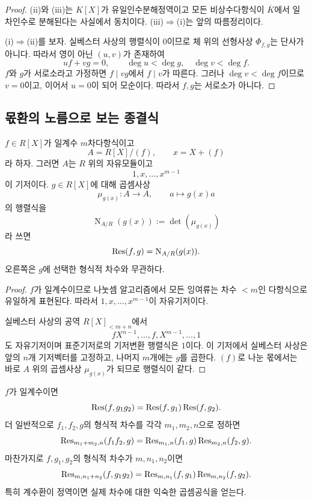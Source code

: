 \begin{proof}
(ii)와 (iii)는 $K[X]$가 유일인수분해정역이고 모든 비상수다항식이 $\overline K$에서 일차인수로 분해된다는 사실에서 동치이다. (iii)$\Rightarrow$(i)는 앞의 따름정리이다.

(i)$\Rightarrow$(ii)를 보자. 실베스터 사상의 행렬식이 $0$이므로 체 위의 선형사상 $\Phi_{f,g}$는 단사가 아니다. 따라서 영이 아닌 $(u,v)$가 존재하여
\[
  uf+vg=0,
  \qquad
  \deg u<\deg g,\quad \deg v<\deg f.
\]
$f$와 $g$가 서로소라고 가정하면 $f\mid vg$에서 $f\mid v$가 따른다. 그러나 $\deg v<\deg f$이므로 $v=0$이고, 이어서 $u=0$이 되어 모순이다. 따라서 $f,g$는 서로소가 아니다.
\end{proof}

\subsection{몫환의 노름으로 보는 종결식}

\begin{proposition}[노름 해석]
\label{prop:resultant-norm}
$f\in R[X]$가 일계수 $m$차다항식이고
\[
  A=R[X]/(f),
  \qquad x=X+(f)
\]
라 하자. 그러면 $A$는 $R$ 위의 자유모듈이고
\[
  1,x,\dots,x^{m-1}
\]
이 기저이다. $g\in R[X]$에 대해 곱셈사상
\[
  \mu_{g(x)}:A\to A,
  \qquad a\longmapsto g(x)a
\]
의 행렬식을
\[
  \operatorname N_{A/R}(g(x))
  :=\det(\mu_{g(x)})
\]
라 쓰면
\[
  \operatorname{Res}(f,g)=\operatorname N_{A/R}(g(x)).
\]
오른쪽은 $g$에 선택한 형식적 차수와 무관하다.
\end{proposition}

\begin{proof}
$f$가 일계수이므로 나눗셈 알고리즘에서 모든 잉여류는 차수 $<m$인 다항식으로 유일하게 표현된다. 따라서 $1,x,\dots,x^{m-1}$이 자유기저이다.

실베스터 사상의 공역 $R[X]_{<m+n}$에서
\[
  fX^{n-1},\dots,f,
  X^{m-1},\dots,1
\]
도 자유기저이며 표준기저로의 기저변환 행렬식은 $1$이다. 이 기저에서 실베스터 사상은 앞의 $n$개 기저벡터를 고정하고, 나머지 $m$개에는 $g$를 곱한다. $(f)$로 나눈 몫에서는 바로 $A$ 위의 곱셈사상 $\mu_{g(x)}$가 되므로 행렬식이 같다.
\end{proof}

\begin{corollary}[곱셈성]
$f$가 일계수이면
\[
  \operatorname{Res}(f,g_1g_2)
  =\operatorname{Res}(f,g_1)\operatorname{Res}(f,g_2).
\]
더 일반적으로 $f_1,f_2,g$의 형식적 차수를 각각 $m_1,m_2,n$으로 정하면
\[
  \operatorname{Res}_{m_1+m_2,n}(f_1f_2,g)
  =\operatorname{Res}_{m_1,n}(f_1,g)\operatorname{Res}_{m_2,n}(f_2,g).
\]
마찬가지로 $f,g_1,g_2$의 형식적 차수가 $m,n_1,n_2$이면
\[
  \operatorname{Res}_{m,n_1+n_2}(f,g_1g_2)
  =\operatorname{Res}_{m,n_1}(f,g_1)\operatorname{Res}_{m,n_2}(f,g_2).
\]
특히 계수환이 정역이면 실제 차수에 대한 익숙한 곱셈공식을 얻는다.
\end{corollary}

